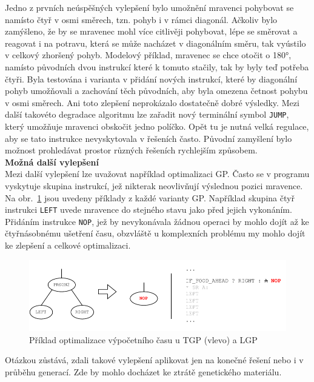 Jedno z prvních neúspěšných vylepšení bylo umožnění mravenci pohybovat se namísto čtyř v osmi směrech, tzn. pohyb i v rámci diagonál. Ačkoliv bylo zamýšleno, že by se mravenec mohl více citlivěji pohybovat, lépe se směrovat a reagovat i na potravu, která se může nacházet v diagonálním směru, tak vyústilo v celkový zhoršený pohyb. Modelový příklad, mravenec se chce otočit o 180°, namísto původních dvou instrukcí které k tomuto stačily, tak by byly teď potřeba čtyři. Byla testována i varianta v přidání nových instrukcí, které by diagonální pohyb umožňovali a zachování těch původních, aby byla omezena četnost pohybu v osmi směrech. Ani toto zlepšení neprokázalo dostatečně dobré výsledky.
Mezi další takovéto degradace algoritmu lze zařadit nový terminální symbol \texttt{JUMP}, který umožňuje mravenci obskočit jedno políčko. Opět tu je nutná velká regulace, aby se tato instrukce nevyskytovala v řešeních často. Původní zamyšlení bylo možnost prohledávat prostor různých řešeních rychlejším způsobem. \\

\noindent\textbf{Možná další vylepšení} \\
Mezi další vylepšení lze uvažovat například optimalizaci GP. Často se v programu vyskytuje skupina instrukcí, jež nikterak neovlivňují výslednou pozici mravence. Na obr.~\ref{fig:optimalization} jsou uvedeny příklady z každé varianty GP. Například skupina čtyř instrukci \texttt{LEFT} uvede mravence do stejného stavu jako před jejich vykonáním. Přidáním instrukce \texttt{NOP}, jež by nevykonávala žádnou operaci by mohlo dojít až ke čtyřnásobnému ušetření času, obzvláště u komplexních problému my mohlo dojít ke zlepšení a celkové optimalizaci.

\begin{figure}[!h]
    \centering
    \includegraphics{obrazky-figures/optimalization.pdf}
    \caption{Příklad optimalizace výpočetního času u TGP (vlevo) a LGP}
    \label{fig:optimalization}
\end{figure}

\noindent Otázkou zůstává, zdali takové vylepšení aplikovat jen na konečné řešení nebo i v průběhu generací. Zde by mohlo docházet ke ztrátě genetického materiálu.

